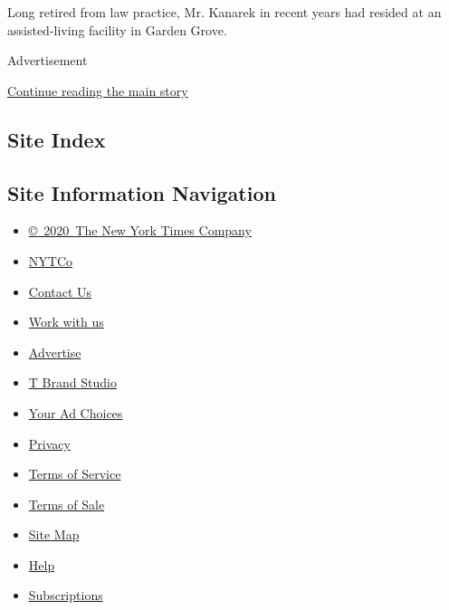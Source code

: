Long retired from law practice, Mr. Kanarek in recent years had resided
at an assisted-living facility in Garden Grove.

Advertisement

\protect\hyperlink{after-bottom}{Continue reading the main story}

\hypertarget{site-index}{%
\subsection{Site Index}\label{site-index}}

\hypertarget{site-information-navigation}{%
\subsection{Site Information
Navigation}\label{site-information-navigation}}

\begin{itemize}
\tightlist
\item
  \href{https://help.nytimes3xbfgragh.onion/hc/en-us/articles/115014792127-Copyright-notice}{©~2020~The
  New York Times Company}
\end{itemize}

\begin{itemize}
\tightlist
\item
  \href{https://www.nytco.com/}{NYTCo}
\item
  \href{https://help.nytimes3xbfgragh.onion/hc/en-us/articles/115015385887-Contact-Us}{Contact
  Us}
\item
  \href{https://www.nytco.com/careers/}{Work with us}
\item
  \href{https://nytmediakit.com/}{Advertise}
\item
  \href{http://www.tbrandstudio.com/}{T Brand Studio}
\item
  \href{https://www.nytimes3xbfgragh.onion/privacy/cookie-policy\#how-do-i-manage-trackers}{Your
  Ad Choices}
\item
  \href{https://www.nytimes3xbfgragh.onion/privacy}{Privacy}
\item
  \href{https://help.nytimes3xbfgragh.onion/hc/en-us/articles/115014893428-Terms-of-service}{Terms
  of Service}
\item
  \href{https://help.nytimes3xbfgragh.onion/hc/en-us/articles/115014893968-Terms-of-sale}{Terms
  of Sale}
\item
  \href{https://spiderbites.nytimes3xbfgragh.onion}{Site Map}
\item
  \href{https://help.nytimes3xbfgragh.onion/hc/en-us}{Help}
\item
  \href{https://www.nytimes3xbfgragh.onion/subscription?campaignId=37WXW}{Subscriptions}
\end{itemize}

